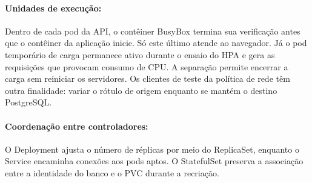 \paragraph{Unidades de execução:} Dentro de cada pod da API, o contêiner BusyBox termina sua verificação antes que o contêiner da aplicação inicie. Só este último atende ao navegador. Já o pod temporário de carga permanece ativo durante o ensaio do HPA e gera as requisições que provocam consumo de CPU. A separação permite encerrar a carga sem reiniciar os servidores. Os clientes de teste da política de rede têm outra finalidade: variar o rótulo de origem enquanto se mantém o destino PostgreSQL.

\paragraph{Coordenação entre controladores:} O Deployment ajusta o número de réplicas por meio do ReplicaSet, enquanto o Service encaminha conexões aos pods aptos. O StatefulSet preserva a associação entre a identidade do banco e o PVC durante a recriação.
